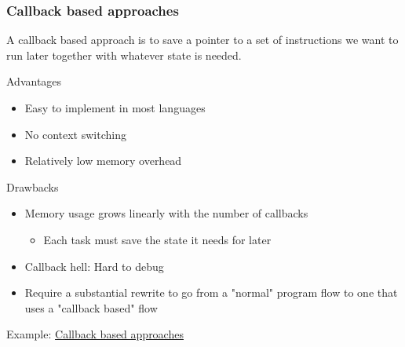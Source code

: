 \begin{frame}[fragile]
    \frametitle{Callback based approaches}
% 
% 
 A callback based approach is to save a pointer to a set of instructions we want to run later together with whatever state is needed.
 
{\color{red}Advantages}
 
     \begin{itemize}
         \item Easy to implement in most languages
         \item No context switching
         \item Relatively low memory overhead
     \end{itemize}
 
{\color{red}Drawbacks}
 
     \begin{itemize}
         \item Memory usage grows linearly with the number of callbacks
     	\begin{itemize}
     	    \item Each task must save the state it needs for later
     	\end{itemize}
         \item Callback hell: Hard to debug
         \item Require a substantial rewrite to go from a "normal" program flow to one that uses a "callback based" flow
     \end{itemize}
 
Example: \href{https://cfsamson.github.io/books-futures-explained/0_background_information.html#callback-based-approaches}{Callback based approaches}
 
\end{frame}
